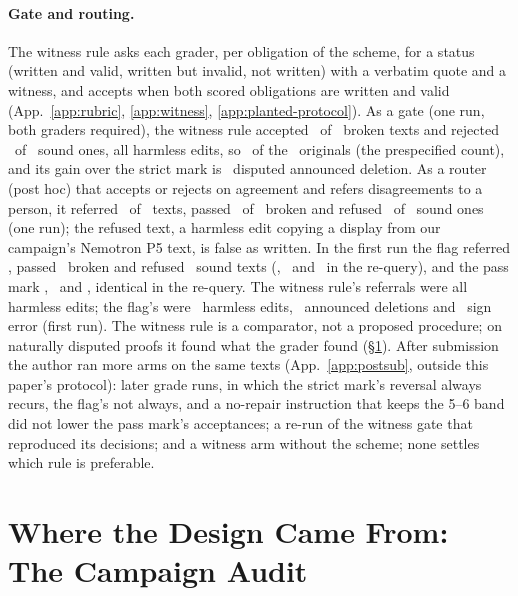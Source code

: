 \documentclass{article}
\begin{document}
\paragraph{Gate and routing.} The witness rule asks each grader, per obligation of the scheme, for a status (written and valid, written but invalid, not written) with a verbatim quote and a witness, and accepts when both scored obligations are written and valid (App.~\ref{app:rubric}, \ref{app:witness}, \ref{app:planted-protocol}). As a gate (one run, both graders required), the witness rule accepted \CRWitnessBrokenAccP\ of \CRNBroken\ broken texts and rejected \CRWitnessSoundRejP\ of \CRNSound\ sound ones, all harmless edits, so \CRWitnessORejP\ of the \CRNPerClass\ originals (the prespecified count), and its gain over the strict mark is \CRWitnessGainOverStrictP\ disputed announced deletion. As a router (post hoc) that accepts or rejects on agreement and refers disagreements to a person, it referred \CRRouteWitnessRefP\ of \CRNTexts\ texts, passed \CRRouteWitnessBrokenP\ of \CRNBroken\ broken and refused \CRRouteWitnessSoundP\ of \CRNSound\ sound ones (one run); the refused text, a harmless edit copying a display from our campaign's Nemotron P5 text, is false as written. In the first run the flag referred \CRRouteFlagRefP, passed \CRRouteFlagBrokenP\ broken and refused \CRRouteFlagSoundP\ sound texts (\CRRouteFlagRefR, \CRRouteFlagBrokenR\ and \CRRouteFlagSoundR\ in the re-query), and the pass mark \CRRoutePassRefP, \CRRoutePassBrokenP\ and \CRRoutePassSoundP, identical in the re-query. The witness rule's referrals were all harmless edits; the flag's were \CRRouteFlagRefHP\ harmless edits, \CRRouteFlagRefGP\ announced deletions and \CRRouteFlagRefFP\ sign error (first run). The witness rule is a comparator, not a proposed procedure; on naturally disputed proofs it found what the grader found (\S\ref{sec:campaign}). After submission the author ran more arms on the same texts (App.~\ref{app:postsub}, outside this paper's protocol): later grade runs, in which the strict mark's reversal always recurs, the flag's not always, and a no-repair instruction that keeps the 5--6 band did not lower the pass mark's acceptances; a re-run of the witness gate that reproduced its decisions; and a witness arm without the scheme; none settles which rule is preferable.

\section{Where the Design Came From: The Campaign Audit}
\label{sec:campaign}\label{sec:stack}\label{sec:closure}\label{sec:findings}\label{sec:evidence}\label{sec:pilot}\label{sec:witness}\label{sec:refadj}
\end{document}
